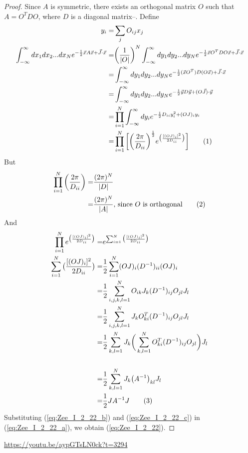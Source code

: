\documentclass[]{article}
\newcommand\numberthis{\addtocounter{equation}{1}\tag{\theequation}}
\begin{document}
\begin{proof}
	Since $A$ is symmetric, there exists an orthogonal matrix $O$ such that $A=O^T D O$, where $D$ is a diagonal matrix--\cite{bellman1970introduction}. Define
	\begin{align*}
		y_i =& \sum_j O_{ij}x_j\\
		\int_{-\infty}^{\infty}dx_1 dx_2...dx_N e^{-\frac{1}{2}\vec{x}A\vec{x} + \vec{J} \cdot \vec{x}}=&\bigg(\frac{1}{\vert O \vert}\bigg)^N \int_{-\infty}^{\infty}dy_1 dy_2...dy_Ne^{-\frac{1}{2}\vec{x}O^T D O\vec{x} + \vec{J} \cdot \vec{x}}\\
		=& \int_{-\infty}^{\infty}dy_1 dy_2...dy_N e^{-\frac{1}{2}(\vec{x}O^T) D (O\vec{x}) + \vec{J} \cdot \vec{x}}\\
		=& \int_{-\infty}^{\infty}dy_1 dy_2...dy_N e^{- \frac{1}{2} \vec{y}D \vec{y} + (O\vec{J})\cdot \vec{y}}\\
		=& \prod_{i=1}^N \int_{-\infty}^{\infty}dy_i e^{- \frac{1}{2} D_{ii}y_i^2 + (OJ)_i y_i}\\
		=& \prod_{i=1}^N \bigg[\bigg(\frac{2\pi}{D_{ii}}\bigg)^\frac{1}{2} e^{\big(\frac{[(OJ)_i]^2}{2D_{ii}}\big)}\bigg] \numberthis \label {eq:Zee_I_2_22_a}
	\end{align*}
	But
	\begin{align*}
		\prod_{i=1}^N \bigg(\frac{2\pi}{D_{ii}}\bigg) =& \frac{({2\pi})^N}{\vert D \vert}\\
		=& \frac{({2\pi})^N}{\vert A \vert} \text{, since $O$ is orthogonal} \numberthis \label {eq:Zee_I_2_22_b}
	\end{align*}
	And
	\begin{align*}
		\prod_{i=1}^N e^{\big(\frac{[(OJ)_i]^2}{2D_{ii}}\big)} =& e^{\sum_{i=1}^N {\big(\frac{[(OJ)_i]^2}{2D_{ii}}\big)}}\\
		\sum_{i=1}^N {\big(\frac{[(OJ)_i]^2}{2D_{ii}}\big)} =& \frac{1}{2} \sum_{i=1}^N (OJ)_i (D^{-1})_{ii} (OJ)_i\\
		 =& \frac{1}{2} \sum_{i,j,k,l=1}^N O_{ik} J_k (D^{-1})_{ij} O_{jl} J_l\\
		 =& \frac{1}{2} \sum_{i,j,k,l=1}^N J_k O^T_{ki}  (D^{-1})_{ij} O_{jl} J_l \\
		 =& \frac{1}{2} \sum_{k,l=1}^N J_k \bigg(\sum_{k,l=1}^N O^T_{ki}  (D^{-1})_{ij} O_{jl}\bigg) J_l\\
		  \\
		 =& \frac{1}{2} \sum_{k,l=1}^N J_k \big(A^{-1}\big)_{kl} J_l \\
		 =& \frac{1}{2} J A^{-1} J \numberthis \label {eq:Zee_I_2_22_c}
	\end{align*}
	Substituting (\ref{eq:Zee_I_2_22_b}) and (\ref{eq:Zee_I_2_22_c}) in (\ref{eq:Zee_I_2_22_a}), we obtain (\ref{eq:Zee_I_2_22}).
\end{proof}
\url{https://youtu.be/aypGTsLN0ck?t=3294}



\raggedright

\end{document}
